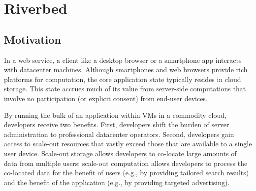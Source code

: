 \section{Riverbed}

\subsection{Motivation}
In a web service, a client like a desktop
browser or a smartphone app interacts with datacenter
machines. Although smartphones and web browsers provide
rich platforms for computation, the core application
state typically resides in cloud storage. This state
accrues much of its value from server-side
computations that involve no participation (or explicit
consent) from end-user devices.

By running the bulk of an application within VMs
in a commodity cloud, developers receive two
benefits. First, developers shift the burden of server
administration to professional datacenter operators. Second,
developers gain access to scale-out resources that vastly
exceed those that are available to a single user device.
Scale-out storage allows developers to co-locate large
amounts of data from multiple users; scale-out computation
allows developers to process the co-located data for the
benefit of users (e.g., by providing tailored search
results) and the benefit of the application (e.g., by
providing targeted advertising).

